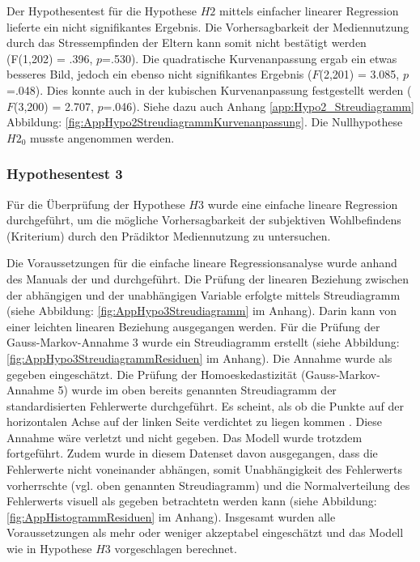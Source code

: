 Der Hypothesentest für die Hypothese $H2$ mittels einfacher linearer Regression lieferte ein nicht signifikantes Ergebnis. Die Vorhersagbarkeit der Mediennutzung durch das Stressempfinden der Eltern kann somit nicht bestätigt werden (F(1,202) = .396, $p$=.530). Die quadratische Kurvenanpassung ergab ein etwas besseres Bild, jedoch ein ebenso nicht signifikantes Ergebnis ($F$(2,201) = 3.085, $p$=.048). Dies konnte auch in der kubischen Kurvenanpassung festgestellt werden ($F$(3,200) = 2.707, $p$=.046). Siehe dazu auch Anhang \ref{app:Hypo2_Streudiagramm} Abbildung: \ref{fig:AppHypo2StreudiagrammKurvenanpassung}. Die Nullhypothese $H2_{0}$ musste angenommen werden.

\subsubsection{Hypothesentest 3}
Für die Überprüfung der Hypothese $H3$ wurde eine einfache lineare Regression durchgeführt, um die mögliche Vorhersagbarkeit der subjektiven Wohlbefindens (Kriterium) durch den Prädiktor Mediennutzung zu untersuchen.

Die Voraussetzungen für die einfache lineare Regressionsanalyse wurde anhand des Manuals der  und  durchgeführt. Die Prüfung der linearen Beziehung zwischen der abhängigen und der unabhängigen Variable erfolgte mittels Streudiagramm (siehe Abbildung: \ref{fig:AppHypo3Streudiagramm} im Anhang). Darin kann von einer leichten linearen Beziehung ausgegangen werden. Für die Prüfung der Gauss-Markov-Annahme 3 wurde ein Streudiagramm erstellt (siehe Abbildung: \ref{fig:AppHypo3StreudiagrammResiduen} im Anhang). Die Annahme wurde als gegeben eingeschätzt. Die Prüfung der Homoeskedastizität (Gauss-Markov-Annahme 5) wurde im oben bereits genannten Streudiagramm der standardisierten Fehlerwerte durchgeführt. Es scheint, als ob die Punkte auf der horizontalen Achse auf der linken Seite verdichtet zu liegen kommen \cite{Hemmerich2018}. Diese Annahme wäre verletzt und nicht gegeben. Das Modell wurde trotzdem fortgeführt. Zudem wurde in diesem Datenset davon ausgegangen, dass die Fehlerwerte nicht voneinander abhängen, somit Unabhängigkeit des Fehlerwerts vorherrschte (vgl. oben genannten Streudiagramm) und die Normalverteilung des Fehlerwerts visuell als gegeben betrachtetn werden kann (siehe Abbildung: \ref{fig:AppHistogrammResiduen} im Anhang). Insgesamt wurden alle Voraussetzungen als mehr oder weniger akzeptabel eingeschätzt und das Modell wie in Hypothese $H3$ vorgeschlagen berechnet.


